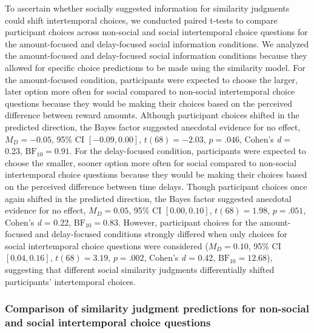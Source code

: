 \documentclass[
  pub,floatsintext]{apa6}
\begin{document}
To ascertain whether socially suggested information for similarity judgments could shift intertemporal choices, we conducted paired t-tests to compare participant choices across non-social and social intertemporal choice questions for the amount-focused and delay-focused social information conditions. We analyzed the amount-focused and delay-focused social information conditions because they allowed for specific choice predictions to be made using the similarity model. For the amount-focused condition, participants were expected to choose the larger, later option more often for social compared to non-social intertemporal choice questions because they would be making their choices based on the perceived difference between reward amounts. Although participant choices shifted in the predicted direction, the Bayes factor suggested anecdotal evidence for no effect, \(M_D = -0.05\), 95\% CI \([-0.09, 0.00]\), \(t(68) = -2.03\), \(p = .046\), Cohen's \emph{d} = 0.23, \(\mathrm{BF}_{\textrm{10}} = 0.91\). For the delay-focused condition, participants were expected to choose the smaller, sooner option more often for social compared to non-social intertemporal choice questions because they would be making their choices based on the perceived difference between time delays. Though participant choices once again shifted in the predicted direction, the Bayes factor suggested anecdotal evidence for no effect, \(M_D = 0.05\), 95\% CI \([0.00, 0.10]\), \(t(68) = 1.98\), \(p = .051\), Cohen's \emph{d} = 0.22, \(\mathrm{BF}_{\textrm{10}} = 0.83\). However, participant choices for the amount-focused and delay-focused conditions strongly differed when only choices for social intertemporal choice questions were considered (\(M_D = 0.10\), 95\% CI \([0.04, 0.16]\), \(t(68) = 3.19\), \(p = .002\), Cohen's \emph{d} = 0.42, \(\mathrm{BF}_{\textrm{10}} = 12.68\)), suggesting that different social similarity judgments differentially shifted participants' intertemporal choices.

\hypertarget{comparison-of-similarity-judgment-predictions-for-non-social-and-social-intertemporal-choice-questions}{%
\subsubsection{Comparison of similarity judgment predictions for non-social and social intertemporal choice questions}\label{comparison-of-similarity-judgment-predictions-for-non-social-and-social-intertemporal-choice-questions}}
\end{document}
